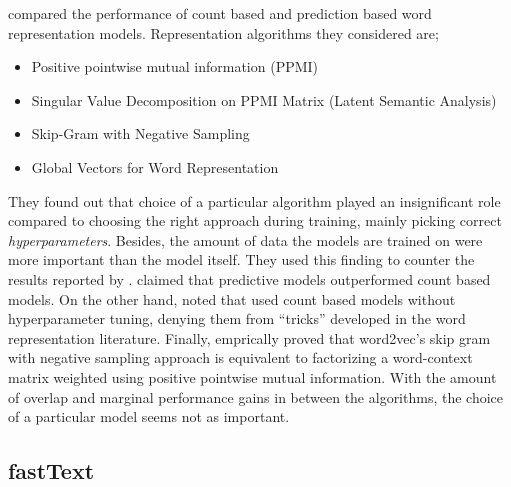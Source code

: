 
\textcite{levy_improving_2015} compared the performance of count based and prediction based word representation models.
Representation algorithms they considered are;
\begin{itemize}
    \item Positive pointwise mutual information (PPMI)~\cite{church_word_1990, bullinaria_extracting_2007}
    \item Singular Value Decomposition on PPMI Matrix (Latent Semantic Analysis)~\cite{deerwester_indexing_1990}
    \item Skip-Gram with Negative Sampling~\cite{mikolov_distributed_2013}
    \item Global Vectors for Word Representation~\cite{pennington_glove_2014}
\end{itemize}
They found out that choice of a particular algorithm played an insignificant role compared to choosing the right approach during training, mainly picking correct \emph{hyperparameters}.
Besides, the amount of data the models are trained on were more important than the model itself.
They used this finding to counter the results reported by \textcite{baroni_dont_2014}.
\citeauthor{baroni_dont_2014} claimed that predictive models outperformed count based models.
On the other hand, \citeauthor{levy_improving_2015} noted that \citeauthor{baroni_dont_2014} used count based models without hyperparameter tuning, denying them from \enquote{tricks} developed in the word representation literature.
Finally, \textcite{levy_neural_2014} emprically proved that word2vec's skip gram with negative sampling approach is equivalent to factorizing a word-context matrix weighted using positive pointwise mutual information.
With the amount of overlap and marginal performance gains in between the algorithms, the choice of a particular model seems not as important.

\subsection{fastText}%
\label{sub:fasttext}

